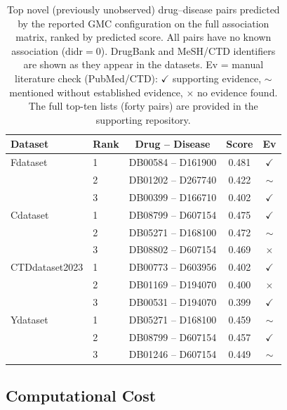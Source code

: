 \documentclass[webpdf,modern,large]{oup-authoring-template}
\begin{document}
\begin{table}[tb]
\centering
\caption{Top novel (previously unobserved) drug--disease pairs predicted by the reported GMC configuration on the full association matrix, ranked by predicted score. All pairs have no known association ($\mathrm{didr}=0$). DrugBank and MeSH/CTD identifiers are shown as they appear in the datasets. Ev = manual literature check (PubMed/CTD): $\checkmark$ supporting evidence, $\sim$ mentioned without established evidence, $\times$ no evidence found. The full top-ten lists (forty pairs) are provided in the supporting repository.}
\label{tab:case}
\small
\begin{tabular}{llccc}
\toprule
Dataset & Rank & Drug -- Disease & Score & Ev \\
\midrule
Fdataset & 1 & DB00584 -- D161900 & 0.481 & $\checkmark$ \\
 & 2 & DB01202 -- D267740 & 0.422 & $\sim$ \\
 & 3 & DB00399 -- D166710 & 0.402 & $\checkmark$ \\
Cdataset & 1 & DB08799 -- D607154 & 0.475 & $\checkmark$ \\
 & 2 & DB05271 -- D168100 & 0.472 & $\sim$ \\
 & 3 & DB08802 -- D607154 & 0.469 & $\times$ \\
CTDdataset2023 & 1 & DB00773 -- D603956 & 0.402 & $\checkmark$ \\
 & 2 & DB01169 -- D194070 & 0.400 & $\times$ \\
 & 3 & DB00531 -- D194070 & 0.399 & $\checkmark$ \\
Ydataset & 1 & DB05271 -- D168100 & 0.459 & $\sim$ \\
 & 2 & DB08799 -- D607154 & 0.457 & $\checkmark$ \\
 & 3 & DB01246 -- D607154 & 0.449 & $\sim$ \\
\bottomrule
\end{tabular}
\end{table}

\subsection{Computational Cost}
\end{document}
